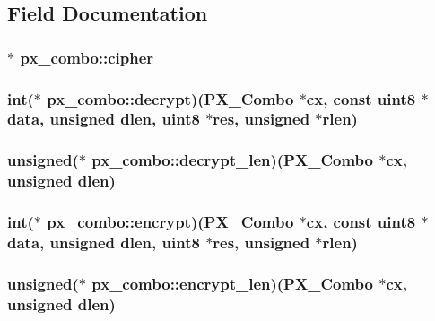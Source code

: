 \subsection{Field Documentation}
\hypertarget{structpx__combo_a63135da76b1246d73c2636e7bc61e8e0}{
\subsubsection[{cipher}]{$\ast$ px\-\_\-combo\-::cipher}}\label{structpx__combo_a63135da76b1246d73c2636e7bc61e8e0}
\hypertarget{structpx__combo_a23e2efbb8021fe4633dad4bf6c4bdd9c}{
\subsubsection[{decrypt}]{\setlength{\rightskip}{0pt plus 5cm}int($\ast$ px\-\_\-combo\-::decrypt)({\bf P\-X\-\_\-\-Combo} $\ast$cx, const {\bf uint8} $\ast$data, unsigned dlen, {\bf uint8} $\ast$res, unsigned $\ast$rlen)}}\label{structpx__combo_a23e2efbb8021fe4633dad4bf6c4bdd9c}
\hypertarget{structpx__combo_a5255ab7d3977adcfb1ef250c1ae8750b}{
\subsubsection[{decrypt\-\_\-len}]{\setlength{\rightskip}{0pt plus 5cm}unsigned($\ast$ px\-\_\-combo\-::decrypt\-\_\-len)({\bf P\-X\-\_\-\-Combo} $\ast$cx, unsigned dlen)}}\label{structpx__combo_a5255ab7d3977adcfb1ef250c1ae8750b}
\hypertarget{structpx__combo_af74336f8a213474316867f3fcaa31b0b}{
\subsubsection[{encrypt}]{\setlength{\rightskip}{0pt plus 5cm}int($\ast$ px\-\_\-combo\-::encrypt)({\bf P\-X\-\_\-\-Combo} $\ast$cx, const {\bf uint8} $\ast$data, unsigned dlen, {\bf uint8} $\ast$res, unsigned $\ast$rlen)}}\label{structpx__combo_af74336f8a213474316867f3fcaa31b0b}
\hypertarget{structpx__combo_a5d77b2bb0597cc58b5a03a17cacddd6e}{
\subsubsection[{encrypt\-\_\-len}]{\setlength{\rightskip}{0pt plus 5cm}unsigned($\ast$ px\-\_\-combo\-::encrypt\-\_\-len)({\bf P\-X\-\_\-\-Combo} $\ast$cx, unsigned dlen)}}\label{structpx__combo_a5d77b2bb0597cc58b5a03a17cacddd6e}
